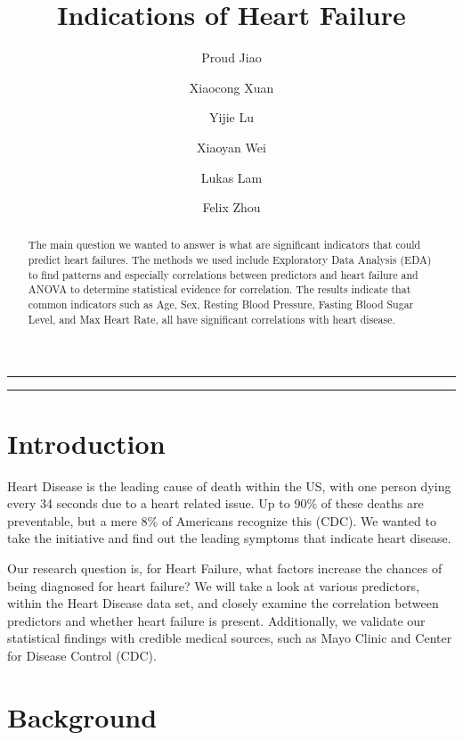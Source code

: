 \documentclass{article}
\author{Proud Jiao}
\author{Xiaocong Xuan}
\author{Yijie Lu}
\author{Xiaoyan Wei}
\author{Lukas Lam}
\author{Felix Zhou}
\affil[]{ Statistics Department, UCLA
}
\title{\textbf{\huge Indications of Heart Failure}\\
 }
\date{}
\begin{document}
\pagestyle{headings}	
\newpage
\setcounter{page}{1}
\renewcommand{\thepage}{\arabic{page}}


	
	
\setlength{\parskip}{0.5em}
	
\maketitle 
	
\noindent\rule{15cm}{0.5pt}
	\begin{abstract}
	The main question we wanted to answer is what are significant indicators that could predict heart failures. The methods we used include Exploratory Data Analysis (EDA) to find patterns and especially correlations between predictors and heart failure and ANOVA to determine statistical evidence for correlation. The results indicate that common indicators such as Age, Sex, Resting Blood Pressure, Fasting Blood Sugar Level, and Max Heart Rate, all have significant correlations with heart disease. 
	\end{abstract}
 
\noindent\rule{15cm}{0.4pt}

\section{Introduction}

Heart Disease is the leading cause of death within the US, with one person dying every 34 seconds due to a heart related issue. Up to 90\% of these deaths are preventable, but a mere 8\% of Americans recognize this (CDC).
We wanted to take the initiative and find out the leading symptoms that indicate heart disease.

Our research question is, for Heart Failure, what factors increase the chances of being diagnosed for heart failure? We will take a look at various predictors, within the Heart Disease data set, and closely examine the correlation between predictors and whether heart failure is present. Additionally, we validate our statistical findings with credible medical sources, such as Mayo Clinic and Center for Disease Control (CDC). 



\section{Background}
\end{document}
